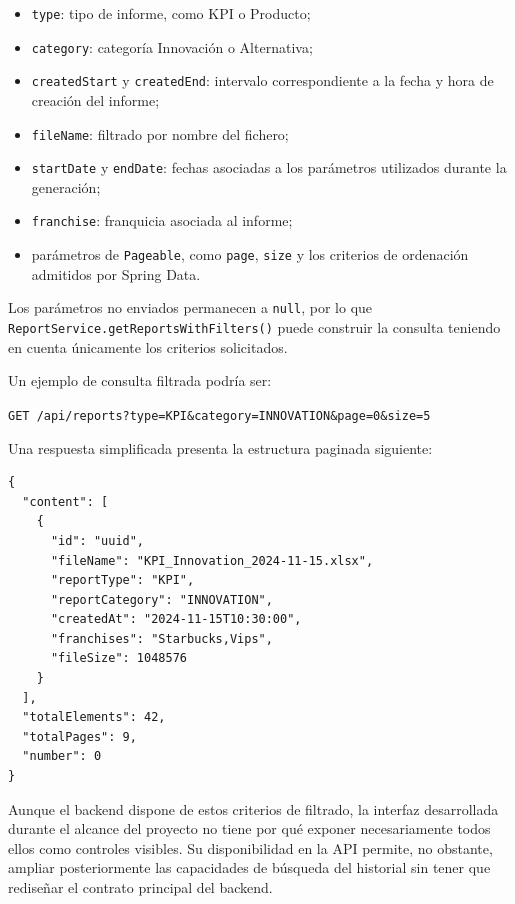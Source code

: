 \documentclass[11pt,a4paper,titlepage,oneside]{report}
\begin{document}
\begin{itemize}

  \item \texttt{type}: tipo de informe, como KPI o Producto;

  \item \texttt{category}: categoría Innovación o Alternativa;

  \item \texttt{createdStart} y \texttt{createdEnd}: intervalo correspondiente
  a la fecha y hora de creación del informe;

  \item \texttt{fileName}: filtrado por nombre del fichero;

  \item \texttt{startDate} y \texttt{endDate}: fechas asociadas a los
  parámetros utilizados durante la generación;

  \item \texttt{franchise}: franquicia asociada al informe;

  \item parámetros de \texttt{Pageable}, como \texttt{page},
  \texttt{size} y los criterios de ordenación admitidos por Spring Data.

\end{itemize}

Los parámetros no enviados permanecen a \texttt{null}, por lo que
\texttt{ReportService.getReportsWithFilters()} puede construir la consulta
teniendo en cuenta únicamente los criterios solicitados.

Un ejemplo de consulta filtrada podría ser:

\begin{center}
\texttt{GET /api/reports?type=KPI\&category=INNOVATION\&page=0\&size=5}
\end{center}

Una respuesta simplificada presenta la estructura paginada siguiente:

\begin{lstlisting}[caption={Ejemplo de respuesta paginada del historial en JSON}]
{
  "content": [
    {
      "id": "uuid",
      "fileName": "KPI_Innovation_2024-11-15.xlsx",
      "reportType": "KPI",
      "reportCategory": "INNOVATION",
      "createdAt": "2024-11-15T10:30:00",
      "franchises": "Starbucks,Vips",
      "fileSize": 1048576
    }
  ],
  "totalElements": 42,
  "totalPages": 9,
  "number": 0
}
\end{lstlisting}

Aunque el backend dispone de estos criterios de filtrado, la interfaz
desarrollada durante el alcance del proyecto no tiene por qué exponer
necesariamente todos ellos como controles visibles. Su disponibilidad en la
API permite, no obstante, ampliar posteriormente las capacidades de búsqueda
del historial sin tener que rediseñar el contrato principal del backend.
\end{document}
